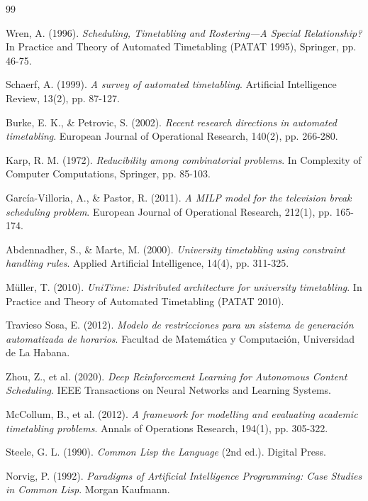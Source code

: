\documentclass[12pt]{article}
\begin{document}
\newpage
\begin{thebibliography}{99}

Wren, A. (1996). \textit{Scheduling, Timetabling and Rostering—A Special Relationship?} In Practice and Theory of Automated Timetabling (PATAT 1995), Springer, pp. 46-75.

Schaerf, A. (1999). \textit{A survey of automated timetabling}. Artificial Intelligence Review, 13(2), pp. 87-127.

Burke, E. K., \& Petrovic, S. (2002). \textit{Recent research directions in automated timetabling}. European Journal of Operational Research, 140(2), pp. 266-280.

Karp, R. M. (1972). \textit{Reducibility among combinatorial problems}. In Complexity of Computer Computations, Springer, pp. 85-103.

García-Villoria, A., \& Pastor, R. (2011). \textit{A MILP model for the television break scheduling problem}. European Journal of Operational Research, 212(1), pp. 165-174.

Abdennadher, S., \& Marte, M. (2000). \textit{University timetabling using constraint handling rules}. Applied Artificial Intelligence, 14(4), pp. 311-325.

Müller, T. (2010). \textit{UniTime: Distributed architecture for university timetabling}. In Practice and Theory of Automated Timetabling (PATAT 2010).

Travieso Sosa, E. (2012). \textit{Modelo de restricciones para un sistema de generación automatizada de horarios}. Facultad de Matemática y Computación, Universidad de La Habana.

Zhou, Z., et al. (2020). \textit{Deep Reinforcement Learning for Autonomous Content Scheduling}. IEEE Transactions on Neural Networks and Learning Systems.

McCollum, B., et al. (2012). \textit{A framework for modelling and evaluating academic timetabling problems}. Annals of Operations Research, 194(1), pp. 305-322.

Steele, G. L. (1990). \textit{Common Lisp the Language} (2nd ed.). Digital Press.

Norvig, P. (1992). \textit{Paradigms of Artificial Intelligence Programming: Case Studies in Common Lisp}. Morgan Kaufmann.

\end{thebibliography}
\end{document}
